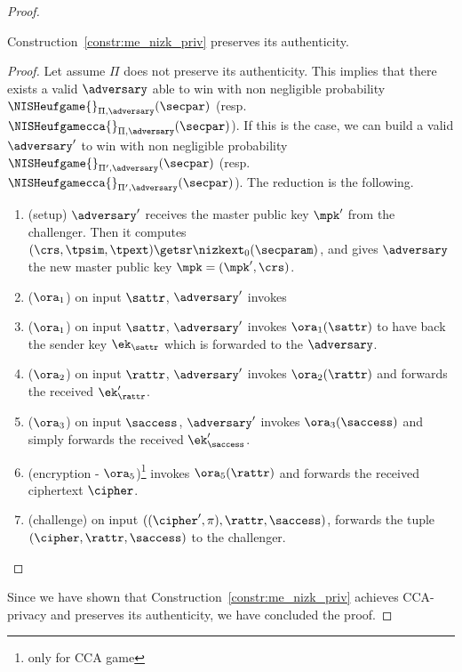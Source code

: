 \begin{proof}
    \begin{lemma}\label{lemma:me_auth_same}
        Construction~\ref{constr:me_nizk_priv} preserves its authenticity.
        \begin{proof}
            Let assume $\Pi$ does not preserve its authenticity. This implies that there exists a valid $\adversary$ able to win with non negligible probability $\NISHeufgame{}_{\Pi, \adversary}(\secpar)$ (resp. $\NISHeufgamecca{}_{\Pi, \adversary}(\secpar)$). If this is the case, we can build a valid $\adversary'$ to win with non negligible probability $\NISHeufgame{}_{\Pi', \adversary}(\secpar)$ (resp. $\NISHeufgamecca{}_{\Pi', \adversary}(\secpar)$). The reduction is the following.

            \begin{enumerate}
                \item (setup) $\adversary'$ receives the master public key $\mpk'$ from the challenger. Then it computes $(\crs,\tpsim,\tpext)\getsr\nizkext_0(\secparam)$, and gives $\adversary$ the new master public key $\mpk = (\mpk', \crs)$.
                \item ($\ora_1$) on input $\sattr$, $\adversary'$ invokes \item ($\ora_1$) on input $\sattr$, $\adversary'$ invokes $\ora_1(\sattr)$ to have back the sender key $\ek_\sattr$ which is forwarded to the $\adversary$.
                \item ($\ora_2$) on input $\rattr$, $\adversary'$ invokes $\ora_2(\rattr)$ and forwards the received $\ek'_\rattr$.
                \item ($\ora_3$) on input $\saccess$, $\adversary'$ invokes $\ora_3(\saccess)$ and simply forwards the received $\ek'_\saccess$.
                \item (encryption - $\ora_5$)\footnote{only for CCA game} invokes $\ora_5(\rattr)$ and forwards the received ciphertext $\cipher$.
                \item (challenge) on input $((\cipher', \pi), \rattr, \saccess)$, forwards the tuple $(\cipher, \rattr, \saccess)$ to the challenger.
            \end{enumerate}
        \end{proof}
    \end{lemma}
    Since we have shown that Construction~\ref{constr:me_nizk_priv} achieves CCA-privacy and preserves its authenticity, we have concluded the proof.
\end{proof}
